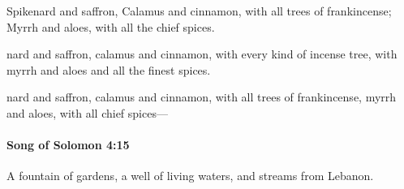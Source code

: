 			\begin{versebox}
					\item[BHS] 
					\item[LXX] 
					\item[ASV] Spikenard and saffron, Calamus and cinnamon, with all trees of frankincense; Myrrh and aloes, with all the chief spices.
					\item[NIV] nard and saffron, calamus and cinnamon, with every kind of incense tree, with myrrh and aloes and all the finest spices.
					\item[NRSV] nard and saffron, calamus and cinnamon, with all trees of frankincense, myrrh and aloes, with all chief spices—
			\end{versebox}

		\paragraph{Song of Solomon 4:15} %
			\label{SONGOFSOLOMON-4-15}

			A fountain of gardens, a well of living waters, and streams from Lebanon.

